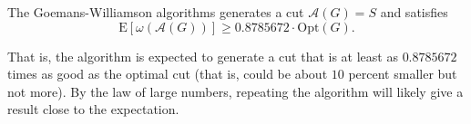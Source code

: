 \begin{theorem}
 The Goemans-Williamson algorithms generates a cut $\mathcal{A}(G)=S$ and satisfies
 \begin{equation*}
  \mathrm{E}[\omega(\mathcal{A}(G))] \geq 0.8785672 \cdot \mathrm{Opt}(G).
 \end{equation*}
\end{theorem}

That is, the algorithm is expected to generate a cut that is at least as $0.8785672$ times as good as the optimal cut (that is, could be about $10$ percent smaller but not more). By the law of large numbers, repeating the algorithm will likely give a result close to the expectation.





